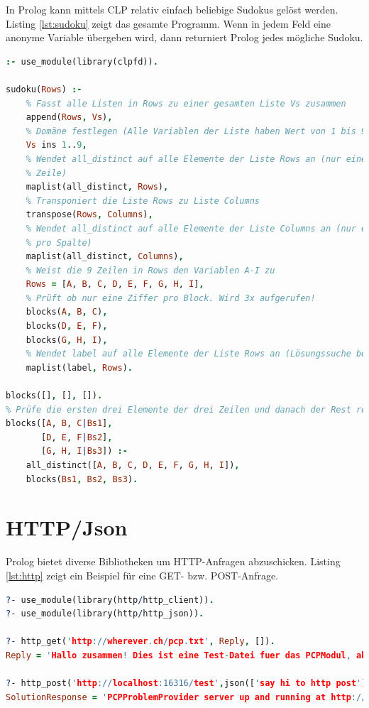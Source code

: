 In Prolog kann mittels CLP relativ einfach beliebige Sudokus gelöst werden. Listing \ref{lst:sudoku} zeigt das gesamte Programm. Wenn in jedem Feld eine anonyme Variable übergeben wird, dann returniert Prolog jedes mögliche Sudoku.

\begin{lstlisting}[language=Prolog, caption=Sudoku, label=lst:sudoku]
:- use_module(library(clpfd)).

sudoku(Rows) :-
	% Fasst alle Listen in Rows zu einer gesamten Liste Vs zusammen
	append(Rows, Vs), 
	% Domäne festlegen (Alle Variablen der Liste haben Wert von 1 bis 9)
	Vs ins 1..9,
	% Wendet all_distinct auf alle Elemente der Liste Rows an (nur eine Ziffer pro 
	% Zeile)
	maplist(all_distinct, Rows),
	% Transponiert die Liste Rows zu Liste Columns
	transpose(Rows, Columns),
	% Wendet all_distinct auf alle Elemente der Liste Columns an (nur eine Ziffer 
	% pro Spalte)
	maplist(all_distinct, Columns),
	% Weist die 9 Zeilen in Rows den Variablen A-I zu
	Rows = [A, B, C, D, E, F, G, H, I],
	% Prüft ob nur eine Ziffer pro Block. Wird 3x aufgerufen!
	blocks(A, B, C), 
	blocks(D, E, F), 
	blocks(G, H, I),
	% Wendet label auf alle Elemente der Liste Rows an (Lösungssuche beginnt)
	maplist(label, Rows).

blocks([], [], []).
% Prüfe die ersten drei Elemente der drei Zeilen und danach der Rest rekursiv
blocks([A, B, C|Bs1], 
	   [D, E, F|Bs2], 
	   [G, H, I|Bs3]) :-
	all_distinct([A, B, C, D, E, F, G, H, I]),
	blocks(Bs1, Bs2, Bs3).
\end{lstlisting}

\section{HTTP/Json}

Prolog bietet diverse Bibliotheken um HTTP-Anfragen abzuschicken. Listing \ref{lst:http} zeigt ein Beispiel für eine GET- bzw. POST-Anfrage.
 
\begin{lstlisting}[language=Prolog, caption=HTTP, label=lst:http]
?- use_module(library(http/http_client)).
?- use_module(library(http/http_json)).

?- http_get('http://wherever.ch/pcp.txt', Reply, []).
Reply = 'Hallo zusammen! Dies ist eine Test-Datei fuer das PCPModul, abgelegt unter http://wherever.ch/pcp.txt. - Prolog rockt! :-) MfG, Ruedi Arnold'.

?- http_post('http://localhost:16316/test',json(['say hi to http post']), SolutionResponse, []).
SolutionResponse = 'PCPProblemProvider server up and running at http://localhost:16316/, reached via HTTP POST - POSTed data: ["say hi to http post" ]'.
\end{lstlisting}